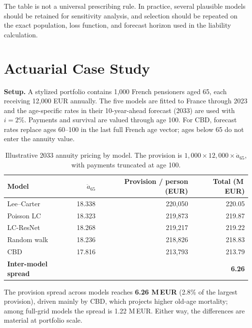 \documentclass[11pt,a4paper]{article}
\begin{document}
The table is not a universal prescribing rule. In practice, several plausible models should be retained for sensitivity analysis, and selection should be repeated on the exact population, loss function, and forecast horizon used in the liability calculation.

\section{Actuarial Case Study}
\label{sec:casestudy}

\textbf{Setup.} A stylized portfolio contains 1{,}000 French pensioners aged 65, each receiving 12{,}000 EUR annually. The five models are fitted to France through 2023 and the age-specific rates in their 10-year-ahead forecast (2033) are used with $i=2\%$. Payments and survival are valued through age 100. For CBD, forecast rates replace ages 60--100 in the last full French age vector; ages below 65 do not enter the annuity value.

\begin{table}[htbp]
\centering
\caption{Illustrative 2033 annuity pricing by model. The provision is $1{,}000 \times 12{,}000 \times \ddot{a}_{65}$, with payments truncated at age 100.}
\label{tab:pricing}
\small
\begin{tabular}{l r r r}
\toprule
Model & $\ddot{a}_{65}$ & Provision / person (EUR) & Total (M\,EUR) \\
\midrule
Lee--Carter  & 18.338 & 220{,}050 & 220.05 \\
Poisson LC   & 18.323 & 219{,}873 & 219.87 \\
LC-ResNet    & 18.268 & 219{,}217 & 219.22 \\
Random walk  & 18.236 & 218{,}826 & 218.83 \\
CBD          & 17.816 & 213{,}793 & 213.79 \\
\midrule
\textbf{Inter-model spread} & & & \textbf{6.26} \\
\bottomrule
\end{tabular}
\end{table}

The provision spread across models reaches \textbf{6.26 M\,EUR} (2.8\% of the largest provision), driven mainly by CBD, which projects higher old-age mortality; among full-grid models the spread is 1.22 M\,EUR. Either way, the differences are material at portfolio scale.
\end{document}
